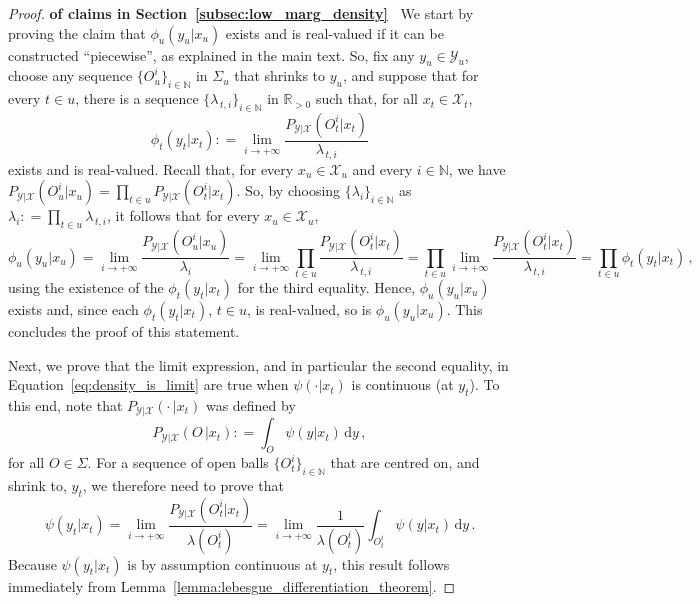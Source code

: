 \documentclass[3p]{elsarticle}
\newcommand{\nats}{\mathbb{N}}
\newcommand{\reals}{\mathbb{R}}
\newcommand{\realspos}{\reals_{>0}}
\newcommand{\states}{\mathcal{X}}
\newcommand{\observs}{\mathcal{Y}}
\newcommand{\coloneqq}{:\!=}
\begin{document}
\begin{proof}{\bf of claims in Section~\ref{subsec:low_marg_density}~}
We start by proving the claim that $\phi_u(y_u\vert x_u)$ exists and is real-valued if it can be constructed ``piecewise'', as explained in the main text. So, fix any $y_u\in\observs_u$, choose any sequence $\{O_u^i\}_{i\in\nats}$ in $\Sigma_u$  that shrinks to $y_u$, and suppose that for every $t\in u$, there is a sequence $\{\lambda_{\,t,i}\}_{i\in\nats}$ in $\realspos$ such that, for all $x_t\in\states_t$,
\begin{equation*}
\phi_t(y_t\vert x_t) \coloneqq \lim_{i\to+\infty} \frac{P_{\observs\vert\states}(O_t^i\vert x_t)}{\lambda_{\,t,i}}
\end{equation*}
exists and is real-valued. Recall that, for every $x_u\in\states_u$ and every $i\in\nats$, we have $P_{\observs\vert\states}(O_u^i\vert x_u)=\prod_{t\in u}P_{\observs\vert\states}(O_t^i\vert x_t)$. So, by choosing $\{\lambda_i\}_{i\in\nats}$ as $\lambda_i\coloneqq \prod_{t\in u}\lambda_{\,t,i}$, it follows that for every $x_u\in\states_u$,
\begin{equation*}
\phi_u(y_u\vert x_u) = \lim_{i\to+\infty} \frac{P_{\observs\vert\states}(O_u^i\vert x_u)}{\lambda_i} = \lim_{i\to+\infty} \prod_{t\in u}\frac{P_{\observs\vert\states}(O_t^i\vert x_t)}{\lambda_{\,t,i}} = \prod_{t\in u}\lim_{i\to+\infty} \frac{P_{\observs\vert\states}(O_t^i\vert x_t)}{\lambda_{\,t,i}} = \prod_{t\in u} \phi_t(y_t\vert x_t)\,,
\end{equation*}
using the existence of the $\phi_t(y_t\vert x_t)$ for the third equality. Hence, $\phi_u(y_u\vert x_u)$ exists and, since each $\phi_t(y_t\vert x_t)$, $t\in u$, is real-valued, so is $\phi_u(y_u\vert x_u)$. This concludes the proof of this statement.

Next, we prove that the limit expression, and in particular the second equality, in Equation~\eqref{eq:density_is_limit} are true when $\psi(\cdot\vert x_t)$ is continuous (at $y_t$). To this end, note that $P_{\observs\vert\states}(\cdot\,\vert x_t)$ was defined by
\begin{equation*}
P_{\observs\vert\states}(O\,\vert x_t) \coloneqq \int_O \psi(y\vert x_t)\,\mathrm{d}y\,,
\end{equation*}
for all $O\in\Sigma$. For a sequence of open balls $\{O_t^i\}_{i\in\nats}$ that are centred on, and shrink to, $y_t$, we therefore need to prove that
\begin{equation*}
\psi(y_t\vert x_t) = \lim_{i\to+\infty}\frac{P_{\observs\vert\states}(O_t^i\vert x_t)}{\lambda(O_t^i)} = \lim_{i\to+\infty}\frac{1}{\lambda(O_t^i)}\int_{O_t^i}\psi(y\vert x_t)\,\mathrm{d} y\,.
\end{equation*}
Because $\psi(y_t\vert x_t)$ is by assumption continuous at $y_t$, this result follows immediately from Lemma~\ref{lemma:lebesgue_differentiation_theorem}.


\end{proof}
\end{document}
